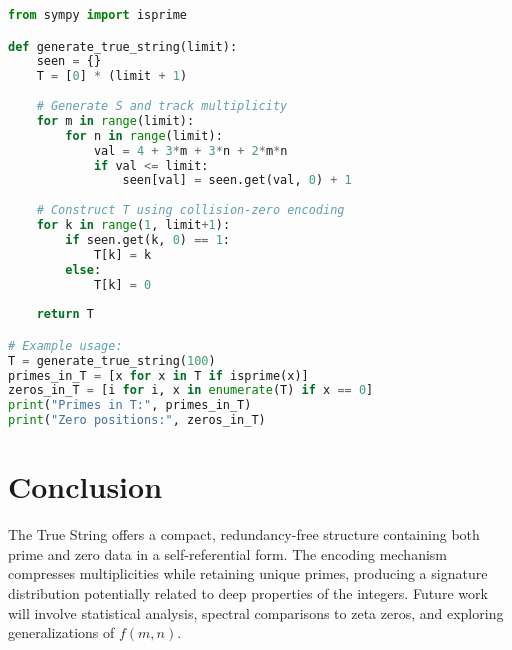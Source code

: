 \documentclass[12pt]{article}
\begin{document}
\begin{lstlisting}[language=Python]
from sympy import isprime

def generate_true_string(limit):
    seen = {}
    T = [0] * (limit + 1)
    
    # Generate S and track multiplicity
    for m in range(limit):
        for n in range(limit):
            val = 4 + 3*m + 3*n + 2*m*n
            if val <= limit:
                seen[val] = seen.get(val, 0) + 1
    
    # Construct T using collision-zero encoding
    for k in range(1, limit+1):
        if seen.get(k, 0) == 1:
            T[k] = k
        else:
            T[k] = 0
    
    return T

# Example usage:
T = generate_true_string(100)
primes_in_T = [x for x in T if isprime(x)]
zeros_in_T = [i for i, x in enumerate(T) if x == 0]
print("Primes in T:", primes_in_T)
print("Zero positions:", zeros_in_T)
\end{lstlisting}

\section{Conclusion}
The True String offers a compact, redundancy-free structure containing both prime and zero data in a self-referential form. The encoding mechanism compresses multiplicities while retaining unique primes, producing a signature distribution potentially related to deep properties of the integers. Future work will involve statistical analysis, spectral comparisons to zeta zeros, and exploring generalizations of $f(m,n)$.



\end{document}
